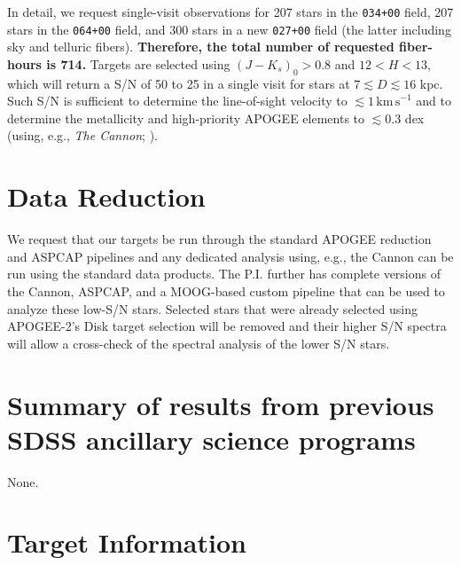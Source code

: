 \documentclass[12pt,preprint]{aastex}
\newcommand{\eg}{e.g.}
\begin{document}
In detail, we request single-visit observations for 207 stars in the
\texttt{034+00} field, 207 stars in the \texttt{064+00} field, and 300
stars in a new \texttt{027+00} field (the latter including sky and
telluric fibers). {\bf Therefore, the total number of requested
  fiber-hours is 714.} Targets are selected using $(J-K_s)_0 > 0.8$
and $12 < H < 13$, which will return a S/N of 50 to 25 in a single
visit for stars at $7 \lesssim D \lesssim 16$ kpc. Such S/N is
sufficient to determine the line-of-sight velocity to
$\lesssim1\,\mathrm{km\,s}^{-1}$ and to determine the metallicity and
high-priority APOGEE elements to $\lesssim0.3$ dex (using, \eg,
\emph{The Cannon}; \citealt{Ness15a}).

\section{Data Reduction}

We request that our targets be run through the standard APOGEE
reduction and ASPCAP pipelines and any dedicated analysis using, \eg,
the Cannon can be run using the standard data products. The
P.I. further has complete versions of the Cannon, ASPCAP, and a
MOOG-based custom pipeline that can be used to analyze these low-S/N
stars. Selected stars that were already selected using APOGEE-2's Disk
target selection will be removed and their higher S/N spectra will
allow a cross-check of the spectral analysis of the lower S/N stars.


\section{Summary of results from previous SDSS ancillary science programs}

None.

\newpage

\section{Target Information}
\end{document}

